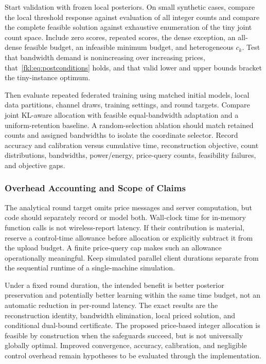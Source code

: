 Start validation with frozen local posteriors. On small synthetic cases, compare the local threshold response against evaluation of all integer counts and compare the complete feasible solution against exhaustive enumeration of the tiny joint count space. Include zero scores, repeated scores, the dense exception, an all-dense feasible budget, an infeasible minimum budget, and heterogeneous $c_k$. Test that bandwidth demand is nonincreasing over increasing prices, that~\eqref{fkl:eq:postconditions} holds, and that valid lower and upper bounds bracket the tiny-instance optimum.

Then evaluate repeated federated training using matched initial models, local data partitions, channel draws, training settings, and round targets. Compare joint KL-aware allocation with feasible equal-bandwidth adaptation and a uniform-retention baseline. A random-selection ablation should match retained counts and assigned bandwidths to isolate the coordinate selector. Record accuracy and calibration versus cumulative time, reconstruction objective, count distributions, bandwidths, power/energy, price-query counts, feasibility failures, and objective gaps.

\subsubsection{Overhead Accounting and Scope of Claims}
The analytical round target omits price messages and server computation, but code should separately record or model both. Wall-clock time for in-memory function calls is not wireless-report latency. If their contribution is material, reserve a control-time allowance before allocation or explicitly subtract it from the upload budget. A finite price-query cap makes such an allowance operationally meaningful. Keep simulated parallel client durations separate from the sequential runtime of a single-machine simulation.

Under a fixed round duration, the intended benefit is better posterior preservation and potentially better learning within the same time budget, not an automatic reduction in per-round latency. The exact results are the reconstruction identity, bandwidth elimination, local priced solution, and conditional dual-bound certificate. The proposed price-based integer allocation is feasible by construction when the safeguards succeed, but is not universally globally optimal. Improved convergence, accuracy, calibration, and negligible control overhead remain hypotheses to be evaluated through the implementation.
